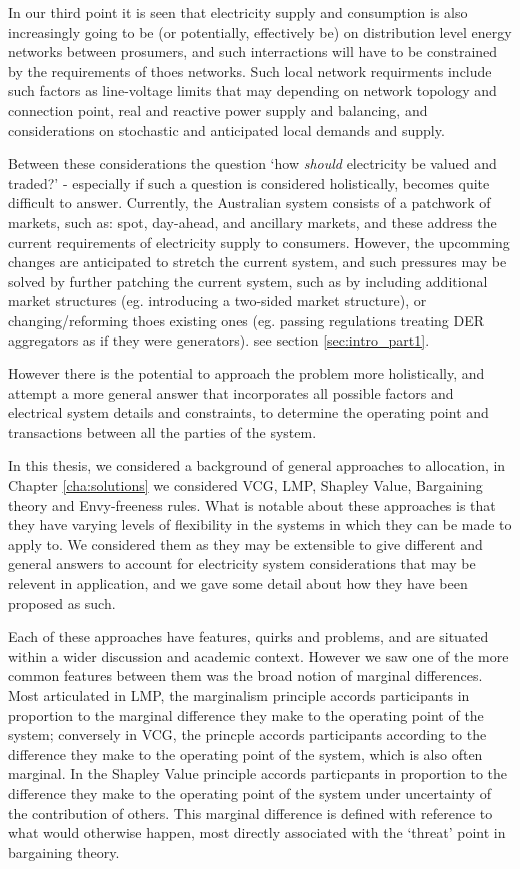 In our third point it is seen that electricity supply and consumption is also increasingly going to be (or potentially, effectively be) on distribution level energy networks between prosumers, and such interractions will have to be constrained by the requirements of thoes networks. Such local network requirments include such factors as line-voltage limits that may depending on network topology and connection point, real and reactive power supply and balancing, and considerations on stochastic and anticipated local demands and supply.

Between these considerations the question `how \textit{should} electricity be valued and traded?' - especially if such a question is considered holistically, becomes quite difficult to answer.
Currently, the Australian system consists of a patchwork of markets, such as: spot, day-ahead, and ancillary markets, and these address the current requirements of electricity supply to consumers.
However, the upcomming changes are anticipated to stretch the current system, and such pressures may be solved by further patching the current system, such as by including additional market structures (eg. introducing a two-sided market structure), or changing/reforming thoes existing ones (eg. passing regulations treating DER aggregators as if they were generators). see section \ref{sec:intro_part1}.

However there is the potential to approach the problem more holistically, and attempt a more general answer that incorporates all possible factors and electrical system details and constraints, to determine the operating point and transactions between all the parties of the system.

In this thesis, we considered a background of general approaches to allocation, in Chapter \ref{cha:solutions} we considered VCG, LMP, Shapley Value, Bargaining theory and Envy-freeness rules.
What is notable about these approaches is that they have varying levels of flexibility in the systems in which they can be made to apply to.
We considered them as they may be extensible to give different and general answers to account for electricity system considerations that may be relevent in application, and we gave some detail about how they have been proposed as such.

Each of these approaches have features, quirks and problems, and are situated within a wider discussion and academic context. However we saw one of the more common features between them was the broad notion of marginal differences.
Most articulated in LMP, the marginalism principle accords participants in proportion to the marginal difference they make to the operating point of the system; conversely in VCG, the princple accords participants according to the difference they make to the operating point of the system, which is also often marginal.
In the Shapley Value principle accords particpants in proportion to the difference they make to the operating point of the system under uncertainty of the contribution of others.
This marginal difference is defined with reference to what would otherwise happen, most directly associated with the `threat' point in bargaining theory.

